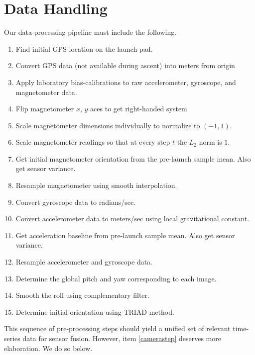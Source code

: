 \documentclass{article}
\begin{document}
\section{Data Handling} \label{sec:data}
Our data-processing pipeline must include the following.
\begin{enumerate}
    \item Find initial GPS location on the launch pad.
    \item Convert GPS data (not available during ascent) into meters from origin
    \item Apply laboratory bias-calibrations to raw accelerometer, gyroscope, and magnetometer data.
    \item Flip magnetometer $x$, $y$ aces to get right-handed system
    \item Scale magnetometer dimensions individually to normalize to $(-1, 1)$.
    \item Scale magnetometer readings so that at every step $t$ the $L_2$ norm is $1$.
    \item Get initial magnetometer orientation from the pre-launch sample mean. Also get sensor variance.
    \item Resample magnetometer using smooth interpolation.
    \item Convert gyroscope data to radians/sec.
    \item Convert accelerometer data to meters/sec using local gravitational constant.
    \item Get acceleration baseline from pre-launch sample mean. Also get sensor variance.
    \item Resample accelerometer and gyroscope data.
    \item \label{camerastep}Determine the global pitch and yaw corresponding to each image.
    \item Smooth the roll using complementary filter.
    \item Determine initial orientation using TRIAD method.
\end{enumerate}
This sequence of pre-processing steps should yield a unified set of relevant time-series data for sensor fusion. However, item \ref{camerastep} deserves more elaboration. We do so below. 
\end{document}
